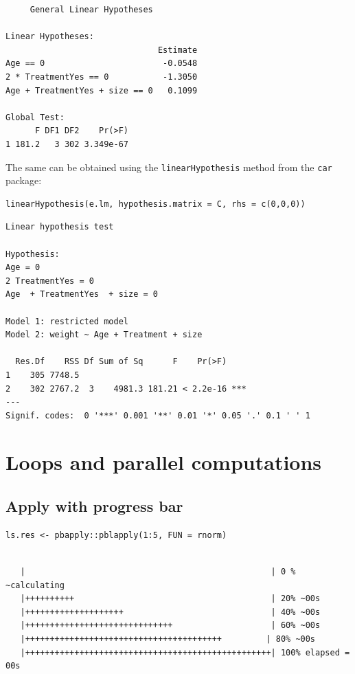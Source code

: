 \documentclass{article}
\begin{document}
\begin{verbatim}
	 General Linear Hypotheses

Linear Hypotheses:
                               Estimate
Age == 0                        -0.0548
2 * TreatmentYes == 0           -1.3050
Age + TreatmentYes + size == 0   0.1099

Global Test:
      F DF1 DF2    Pr(>F)
1 181.2   3 302 3.349e-67
\end{verbatim}

The same can be obtained using the \texttt{linearHypothesis} method from the \texttt{car} package:
\lstset{language=r,label= ,caption= ,captionpos=b,numbers=none}
\begin{lstlisting}
linearHypothesis(e.lm, hypothesis.matrix = C, rhs = c(0,0,0))
\end{lstlisting}

\begin{verbatim}
Linear hypothesis test

Hypothesis:
Age = 0
2 TreatmentYes = 0
Age  + TreatmentYes  + size = 0

Model 1: restricted model
Model 2: weight ~ Age + Treatment + size

  Res.Df    RSS Df Sum of Sq      F    Pr(>F)    
1    305 7748.5                                  
2    302 2767.2  3    4981.3 181.21 < 2.2e-16 ***
---
Signif. codes:  0 '***' 0.001 '**' 0.01 '*' 0.05 '.' 0.1 ' ' 1
\end{verbatim}

\section{Loops and parallel computations}
\label{sec:org7836218}
\subsection{Apply with progress bar}
\label{sec:orgc06d498}

\lstset{language=r,label= ,caption= ,captionpos=b,numbers=none}
\begin{lstlisting}
ls.res <- pbapply::pblapply(1:5, FUN = rnorm)
\end{lstlisting}

\begin{verbatim}

   |                                                  | 0 % ~calculating  
   |++++++++++                                        | 20% ~00s          
   |++++++++++++++++++++                              | 40% ~00s          
   |++++++++++++++++++++++++++++++                    | 60% ~00s          
   |++++++++++++++++++++++++++++++++++++++++         | 80% ~00s          
   |++++++++++++++++++++++++++++++++++++++++++++++++++| 100% elapsed = 00s
\end{verbatim}
\end{document}
